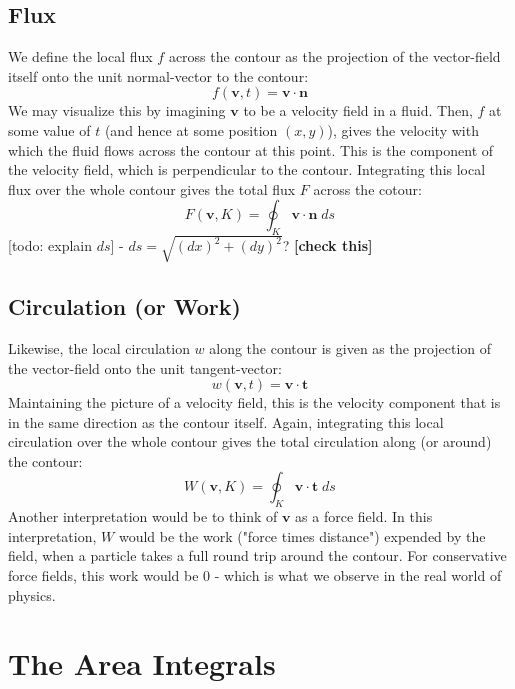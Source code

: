 \subsection{Flux}
We define the local flux $f$ across the contour as the projection of the vector-field itself onto the unit normal-vector to the contour:
\begin{equation}
 f(\mathbf{v}, t) = \mathbf{v} \cdot \mathbf{n}
\end{equation}
We may visualize this by imagining $\mathbf{v}$ to be a velocity field in a fluid. Then, $f$ at some value of $t$ (and hence at some position $(x,y)$), gives the velocity with which the fluid flows across the contour at this point. This is the component of the velocity field, which is perpendicular to the contour. Integrating this local flux over the whole contour gives the total flux $F$ across the cotour:
\begin{equation}
 \boxed
 {
  F(\mathbf{v}, K) = \oint_{K} \mathbf{v} \cdot \mathbf{n} \; ds 
 }
\end{equation}
[todo: explain $ds$] - $ds = \sqrt{(dx)^2 + (dy)^2}$? \textbf{[check this]}

\subsection{Circulation (or Work)}
Likewise, the local circulation $w$ along the contour is given as the projection of the vector-field onto the unit tangent-vector:
\begin{equation}
 w(\mathbf{v}, t) = \mathbf{v} \cdot \mathbf{t}
\end{equation}
Maintaining the picture of a velocity field, this is the velocity component that is in the same direction as the contour itself. Again, integrating this local circulation over the whole contour gives the total circulation along (or around) the contour:
\begin{equation}
 \boxed
 {
  W(\mathbf{v}, K) = \oint_{K} \mathbf{v} \cdot \mathbf{t} \; ds 
 }
\end{equation}
Another interpretation would be to think of $\mathbf{v}$ as a force field. In this interpretation, $W$ would be the work ("force times distance") expended by the field, when a particle takes a full round trip around the contour. For conservative force fields, this work would be $0$ - which is what we observe in the real world of physics.


\section{The Area Integrals}

